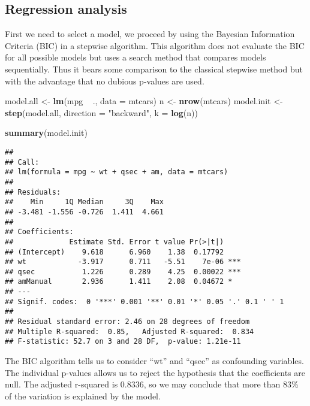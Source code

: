\documentclass[a3paper]{article}
\newenvironment{Shaded}{\begin{snugshade}}{\end{snugshade}}
\newcommand{\KeywordTok}[1]{\textcolor[rgb]{0.13,0.29,0.53}{\textbf{{#1}}}}
\newcommand{\DataTypeTok}[1]{\textcolor[rgb]{0.13,0.29,0.53}{{#1}}}
\newcommand{\StringTok}[1]{\textcolor[rgb]{0.31,0.60,0.02}{{#1}}}
\newcommand{\NormalTok}[1]{{#1}}
\begin{document}
\subsection{Regression analysis}\label{regression-analysis}

First we need to select a model, we proceed by using the Bayesian
Information Criteria (BIC) in a stepwise algorithm. This algorithm does
not evaluate the BIC for all possible models but uses a search method
that compares models sequentially. Thus it bears some comparison to the
classical stepwise method but with the advantage that no dubious
p-values are used.

\begin{Shaded}
\begin{Highlighting}[]
\NormalTok{model.all <-}\StringTok{ }\KeywordTok{lm}\NormalTok{(mpg ~}\StringTok{ }\NormalTok{., }\DataTypeTok{data =} \NormalTok{mtcars)}
\NormalTok{n <-}\StringTok{ }\KeywordTok{nrow}\NormalTok{(mtcars)}
\NormalTok{model.init <-}\StringTok{ }\KeywordTok{step}\NormalTok{(model.all, }\DataTypeTok{direction =} \StringTok{"backward"}\NormalTok{, }\DataTypeTok{k =} \KeywordTok{log}\NormalTok{(n))}
\end{Highlighting}
\end{Shaded}

\begin{Shaded}
\begin{Highlighting}[]
\KeywordTok{summary}\NormalTok{(model.init)}
\end{Highlighting}
\end{Shaded}

\begin{verbatim}
## 
## Call:
## lm(formula = mpg ~ wt + qsec + am, data = mtcars)
## 
## Residuals:
##    Min     1Q Median     3Q    Max 
## -3.481 -1.556 -0.726  1.411  4.661 
## 
## Coefficients:
##             Estimate Std. Error t value Pr(>|t|)    
## (Intercept)    9.618      6.960    1.38  0.17792    
## wt            -3.917      0.711   -5.51    7e-06 ***
## qsec           1.226      0.289    4.25  0.00022 ***
## amManual       2.936      1.411    2.08  0.04672 *  
## ---
## Signif. codes:  0 '***' 0.001 '**' 0.01 '*' 0.05 '.' 0.1 ' ' 1
## 
## Residual standard error: 2.46 on 28 degrees of freedom
## Multiple R-squared:  0.85,   Adjusted R-squared:  0.834 
## F-statistic: 52.7 on 3 and 28 DF,  p-value: 1.21e-11
\end{verbatim}

The BIC algorithm tells us to consider ``wt'' and ``qsec'' as
confounding variables. The individual p-values allows us to reject the
hypothesis that the coefficients are null. The adjusted r-squared is
0.8336, so we may conclude that more than 83\% of the variation is
explained by the model.
\end{document}
